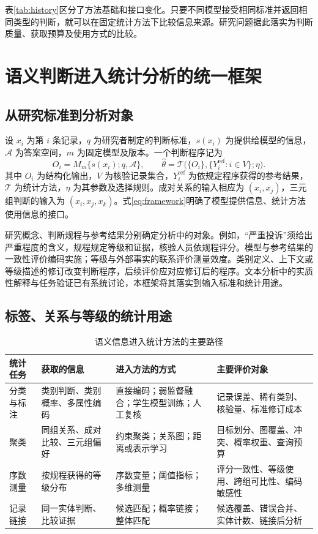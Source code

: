 \documentclass[UTF8,a4paper,zihao=-4,fontset=fandol]{ctexart}
\begin{document}
表\ref{tab:history}区分了方法基础和接口变化。只要不同模型接受相同标准并返回相同类型的判断，就可以在固定统计方法下比较信息来源。研究问题据此落实为判断质量、获取预算及使用方式的比较。

\section{语义判断进入统计分析的统一框架}\label{sec:framework}

\subsection{从研究标准到分析对象}

设 $x_i$ 为第 $i$ 条记录，$q$ 为研究者制定的判断标准，$s(x_i)$ 为提供给模型的信息，$\mathcal A$ 为答案空间，$m$ 为固定模型及版本。一个判断程序记为
\begin{equation}
 O_i=M_m\{s(x_i);q,\mathcal A\},\qquad
 \widehat\theta=\mathcal T\bigl(\{O_i\},\{Y_i^{\mathrm{ref}}:i\in V\};\eta\bigr).
 \label{eq:framework}
\end{equation}
其中 $O_i$ 为结构化输出，$V$ 为核验记录集合，$Y_i^{\mathrm{ref}}$ 为依规定程序获得的参考结果，$\mathcal T$ 为统计方法，$\eta$ 为其参数及选择规则。成对关系的输入相应为 $(x_i,x_j)$，三元组判断的输入为 $(x_i,x_j,x_k)$。式\eqref{eq:framework}明确了模型提供信息、统计方法使用信息的接口。

研究概念、判断规程与参考结果分别确定分析中的对象。例如，“严重投诉”须给出严重程度的含义，规程规定等级和证据，核验人员依规程评分。模型与参考结果的一致性评价编码实施；等级与外部事实的联系评价测量效度。类别定义、上下文或等级描述的修订改变判断程序，后续评价应对应修订后的程序。文本分析中的实质性解释与任务验证已有系统讨论\citep{grimmer2013}，本框架将其落实到输入标准和统计用途。

\subsection{标签、关系与等级的统计用途}

\begin{table}[htbp]
\centering\small
\caption{语义信息进入统计方法的主要路径}\label{tab:framework}
\begin{tabularx}{\textwidth}{@{}L{1.7cm}L{2.7cm}YY@{}}
\toprule
统计任务 & 获取的信息 & 进入方法的方式 & 主要评价对象 \\
\midrule
分类与标注 & 类别判断、类别概率、多属性编码 & 直接编码；弱监督融合；学生模型训练；人工复核 & 记录误差、稀有类别、核验量、标准修订成本 \\
聚类 & 同组关系、成对比较、三元组偏好 & 约束聚类；关系图；距离或表示学习 & 目标划分、图覆盖、冲突、概率权重、查询预算 \\
序数测量 & 按规程获得的等级分布 & 序数变量；阈值指标；多维测量 & 评分一致性、等级使用、跨组可比性、编码敏感性 \\
记录链接 & 同一实体判断、比较证据 & 候选匹配；概率链接；整体匹配 & 候选覆盖、错误合并、实体计数、链接后分析 \\
\bottomrule
\end{tabularx}
\end{table}
\end{document}
